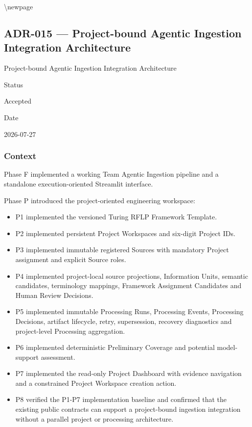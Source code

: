 \textbackslash newpage

\hypertarget{adr-015--project-bound-agentic-ingestion-integration-architecture}{%
\subsection{ADR-015 --- Project-bound Agentic Ingestion Integration Architecture}\label{adr-015--project-bound-agentic-ingestion-integration-architecture}}

Project-bound Agentic Ingestion Integration Architecture

Status

Accepted

Date

2026-07-27

\hypertarget{context}{%
\subsubsection{Context}\label{context}}

Phase F implemented a working Team Agentic Ingestion pipeline and a standalone execution-oriented Streamlit interface.

Phase P introduced the project-oriented engineering workspace:

\begin{itemize}
\tightlist
\item
  P1 implemented the versioned Turing RFLP Framework Template.
\item
  P2 implemented persistent Project Workspaces and six-digit Project IDs.
\item
  P3 implemented immutable registered Sources with mandatory Project assignment and explicit Source roles.
\item
  P4 implemented project-local source projections, Information Units, semantic candidates, terminology mappings, Framework Assignment Candidates and Human Review Decisions.
\item
  P5 implemented immutable Processing Runs, Processing Events, Processing Decisions, artifact lifecycle, retry, supersession, recovery diagnostics and project-level Processing aggregation.
\item
  P6 implemented deterministic Preliminary Coverage and potential model-support assessment.
\item
  P7 implemented the read-only Project Dashboard with evidence navigation and a constrained Project Workspace creation action.
\item
  P8 verified the P1-P7 implementation baseline and confirmed that the existing public contracts can support a project-bound ingestion integration without a parallel project or processing architecture.
\end{itemize}

